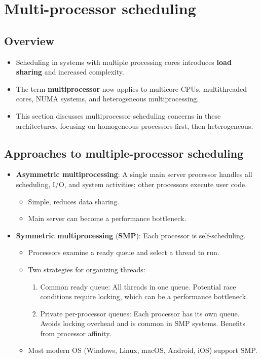 \section{Multi-processor scheduling}\label{sec:5.5}

\subsection{Overview}
\begin{itemize}
    \item Scheduling in systems with multiple processing cores introduces \textbf{load sharing} and increased complexity.
    \item The term \textbf{multiprocessor} now applies to multicore CPUs, multithreaded cores, NUMA systems, and heterogeneous multiprocessing.
    \item This section discusses multiprocessor scheduling concerns in these architectures, focusing on homogeneous processors first, then heterogeneous.
\end{itemize}

\subsection{Approaches to multiple-processor scheduling}
\begin{itemize}
    \item \textbf{Asymmetric multiprocessing}: A single main server processor handles all scheduling, I/O, and system activities; other processors execute user code.
        \begin{itemize}
            \item Simple, reduces data sharing.
            \item Main server can become a performance bottleneck.
        \end{itemize}
    \item \textbf{Symmetric multiprocessing} (\textbf{SMP}): Each processor is self-scheduling.
        \begin{itemize}
            \item Processors examine a ready queue and select a thread to run.
            \item Two strategies for organizing threads:
                \begin{enumerate}
                    \item Common ready queue: All threads in one queue. Potential race conditions require locking, which can be a performance bottleneck.
                    \item Private per-processor queues: Each processor has its own queue. Avoids locking overhead and is common in SMP systems. Benefits from processor affinity.
                \end{enumerate}
            \item Most modern OS (Windows, Linux, macOS, Android, iOS) support SMP.
        \end{itemize}
\end{itemize}

